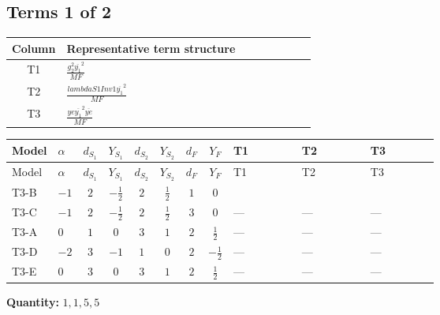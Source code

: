 \documentclass[8pt]{article}
\begin{document}
\begin{landscape}
\subsection*{Terms 1 of 2}
\begin{center}
\begin{tabular}{@{}c >{\raggedright\arraybackslash}p{0.82\linewidth}@{}}
\toprule
Column & Representative term structure \\
\midrule
T1 & \(\displaystyle \frac{g_{2}^{2} \overline{y_{1}}^{2}}{MF}\) \\
\midrule
T2 & \(\displaystyle \frac{lambdaS1Inv1 \overline{y_{1}}^{2}}{MF}\) \\
\midrule
T3 & \(\displaystyle \frac{ye \overline{y_{1}}^{2} \overline{ye}}{MF}\) \\
\midrule
\bottomrule
\end{tabular}
\end{center}
\smallskip
\tiny
\begin{longtable}{@{}llcccccc >{\raggedright\arraybackslash}p{0.21\linewidth} >{\raggedright\arraybackslash}p{0.21\linewidth} >{\raggedright\arraybackslash}p{0.21\linewidth}@{}}
\toprule
Model & $\alpha$ & $d_{S_1}$ & $Y_{S_1}$ & $d_{S_2}$ & $Y_{S_2}$ & $d_F$ & $Y_F$ & T1 & T2 & T3 \\
\midrule
\endfirsthead
\toprule
Model & $\alpha$ & $d_{S_1}$ & $Y_{S_1}$ & $d_{S_2}$ & $Y_{S_2}$ & $d_F$ & $Y_F$ & T1 & T2 & T3 \\
\midrule
\endhead
T3-B & $-1$ & $2$ & $-\frac{1}{2}$ & $2$ & $\frac{1}{2}$ & $1$ & $0$ & \scriptsize\adjustbox{max width=\linewidth}{$\begin{gathered} - \frac{3 g_{2}^{2} \overline{y_{1}}^{2}}{4 MF}\end{gathered}$} & \scriptsize\adjustbox{max width=\linewidth}{$\begin{gathered} - \frac{lambdaS1Inv1 \overline{y_{1}}^{2}}{2 MF}\end{gathered}$} & \scriptsize\adjustbox{max width=\linewidth}{$\begin{gathered} \frac{ye \overline{y_{1}}^{2} \overline{ye}}{4 MF}\end{gathered}$} \\
\midrule
T3-C & $-1$ & $2$ & $-\frac{1}{2}$ & $2$ & $\frac{1}{2}$ & $3$ & $0$ & --- & --- & --- \\
\midrule
T3-A & $0$ & $1$ & $0$ & $3$ & $1$ & $2$ & $\frac{1}{2}$ & --- & --- & --- \\
\midrule
T3-D & $-2$ & $3$ & $-1$ & $1$ & $0$ & $2$ & $-\frac{1}{2}$ & --- & --- & --- \\
\midrule
T3-E & $0$ & $3$ & $0$ & $3$ & $1$ & $2$ & $\frac{1}{2}$ & --- & --- & --- \\
\midrule
\bottomrule
\end{longtable}
\clearpage
\noindent\textbf{Quantity: }$\mathrm{1,1,5,5}$\par\smallskip

\end{landscape}
\end{document}
